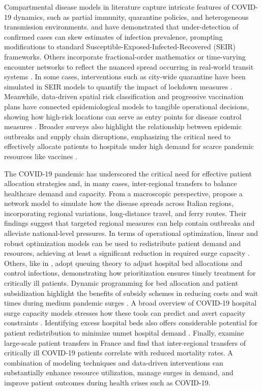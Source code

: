 \documentclass{article}
\begin{document}
Compartmental disease models in literature capture intricate features of COVID-19 dynamics, such as partial immunity, quarantine policies, and heterogeneous transmission environments. \textcite{li2020modeling} and \textcite{crokidakis2020modeling} have demonstrated that under-detection of confirmed cases can skew estimates of infection prevalence, prompting modifications to standard Susceptible-Exposed-Infected-Recovered (SEIR) frameworks. Others incorporate fractional-order mathematics or time-varying encounter networks to reflect the nuanced spread occurring in real-world transit systems \parencite{koziol2020fractional, mo2021modeling}. In some cases, interventions such as city-wide quarantine have been simulated in SEIR models to quantify the impact of lockdown measures \parencite{hou2020effectiveness, he2020seir}. Meanwhile, data-driven spatial risk classification and progressive vaccination plans have connected epidemiological models to tangible operational decisions, showing how high-risk locations can serve as entry points for disease control measures \parencite{hong2024data, bennouna2023covid}. Broader surveys also highlight the relationship between epidemic outbreaks and supply chain disruptions, emphasizing the critical need to effectively allocate patients to hospitals under high demand for scarce pandemic resources like vaccines \parencite{queiroz2022impacts, anastassopoulou2020data}.

The COVID-19 pandemic has underscored the critical need for effective patient allocation strategies and, in many cases, inter-regional transfers to balance healthcare demand and capacity. From a macroscopic perspective, \textcite{della2020network} propose a network model to simulate how the disease spreads across Italian regions, incorporating regional variations, long-distance travel, and ferry routes. Their findings suggest that targeted regional measures can help contain outbreaks and alleviate national-level pressures. In terms of operational optimization, linear and robust optimization models can be used to redistribute patient demand and resources, achieving at least a significant reduction in required surge capacity \parencite{parker2020optimal}. Others, like in \textcite{hu2020hospital}, adopt queuing theory to adjust hospital bed allocations and control infections, demonstrating how prioritization ensures timely treatment for critically ill patients. Dynamic programming for bed allocation and patient subsidization highlight the benefits of subsidy schemes in reducing costs and wait times during medium pandemic surges \parencite{ma2022cope}. A broad overview of COVID-19 hospital surge capacity models stresses how these tools can predict and avert capacity constraints \parencite{klein2022covid}. Identifying excess hospital beds also offers considerable potential for patient redistribution to minimize unmet hospital demand \parencite{soroush2022study}. Finally, \textcite{guillon2021inter} examine large-scale patient transfers in France and find that inter-regional transfers of critically ill COVID-19 patients correlate with reduced mortality rates. A combination of modeling techniques and data-driven interventions can substantially enhance resource utilization, manage surges in demand, and improve patient outcomes during health crises such as COVID-19.
\end{document}
